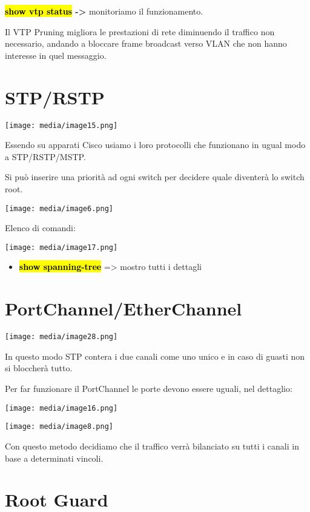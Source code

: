 \textbf{\hl{show vtp status} -\textgreater{}} monitoriamo il
funzionamento.

Il VTP Pruning migliora le prestazioni di rete diminuendo il traffico
non necessario, andando a bloccare frame broadcast verso VLAN che non
hanno interesse in quel messaggio.

\section{STP/RSTP}\label{stprstp}

\texttt{[image: media/image15.png]}

Essendo su apparati Cisco usiamo i loro protocolli che funzionano in
ugual modo a STP/RSTP/MSTP.

Si può inserire una priorità ad ogni switch per decidere quale diventerà
lo switch root.

\texttt{[image: media/image6.png]}

Elenco di comandi:

\texttt{[image: media/image17.png]}

\begin{itemize}
\item
  \textbf{\hl{show spanning-tree}} =\textgreater{} mostro tutti i
  dettagli
\end{itemize}

\section{PortChannel/EtherChannel}\label{portchanneletherchannel}

\texttt{[image: media/image28.png]}

In questo modo STP contera i due canali come uno unico e in caso di
guasti non si bloccherà tutto.

Per far funzionare il PortChannel le porte devono essere uguali, nel
dettaglio:

\texttt{[image: media/image16.png]}

\texttt{[image: media/image8.png]}

Con questo metodo decidiamo che il traffico verrà bilanciato su tutti i
canali in base a determinati vincoli.

\section{Root Guard}\label{root-guard}

